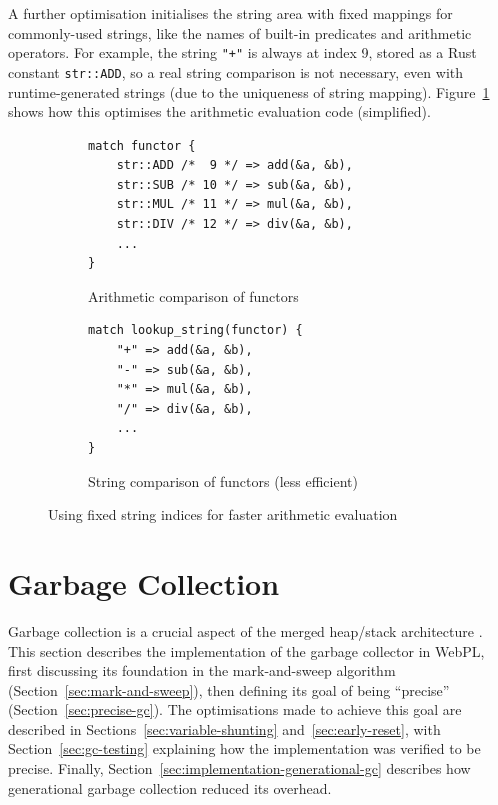 A further optimisation initialises the string area with fixed mappings for commonly-used strings, like the names of built-in predicates and arithmetic operators. For example, the string \texttt{"+"} is always at index 9, stored as a Rust constant \texttt{str::ADD}, so a real string comparison is not necessary, even with runtime-generated strings (due to the uniqueness of string mapping). Figure~\ref{fig:fixed-string-indices} shows how this optimises the arithmetic evaluation code (simplified).

\begin{figure}[H]
\centering
\begin{subfigure}{.5\textwidth}
\centering
\begin{verbatim}
match functor {
    str::ADD /*  9 */ => add(&a, &b),
    str::SUB /* 10 */ => sub(&a, &b),
    str::MUL /* 11 */ => mul(&a, &b),
    str::DIV /* 12 */ => div(&a, &b),
    ...
}
\end{verbatim}
\caption{Arithmetic comparison of functors}
\end{subfigure}%
\begin{subfigure}{.5\textwidth}
\centering
\begin{verbatim}
match lookup_string(functor) {
    "+" => add(&a, &b),
    "-" => sub(&a, &b),
    "*" => mul(&a, &b),
    "/" => div(&a, &b),
    ...
}
\end{verbatim}
\caption{String comparison of functors (less efficient)}
\end{subfigure}
\caption{Using fixed string indices for faster arithmetic evaluation}
\label{fig:fixed-string-indices}
\end{figure}

\newpage

\section{Garbage Collection}

\label{sec:gc-impl}

Garbage collection is a crucial aspect of the merged heap/stack architecture \cite{liEfficientMemoryManagement2000}. This section describes the implementation of the garbage collector in WebPL, first discussing its foundation in the mark-and-sweep algorithm (Section~\ref{sec:mark-and-sweep}), then defining its goal of being ``precise'' (Section~\ref{sec:precise-gc}). The optimisations made to achieve this goal are described in Sections~\ref{sec:variable-shunting} and~\ref{sec:early-reset}, with Section~\ref{sec:gc-testing} explaining how the implementation was verified to be precise. Finally, Section~\ref{sec:implementation-generational-gc} describes how generational garbage collection reduced its overhead.

